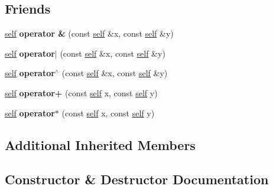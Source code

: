 \subsection*{Friends}
\begin{DoxyCompactItemize}
\item 
\mbox{\label{classez_1_1objects_1_1Boolean_a7b359bdb7de734892f01f402d9aaeb54}} 
\hyperlink{classez_1_1objects_1_1Boolean}{self} {\bfseries operator \&} (const \hyperlink{classez_1_1objects_1_1Boolean}{self} \&x, const \hyperlink{classez_1_1objects_1_1Boolean}{self} \&y)
\item 
\mbox{\label{classez_1_1objects_1_1Boolean_a1f142e40dd9c5d7d535c06ea59cc62ff}} 
\hyperlink{classez_1_1objects_1_1Boolean}{self} {\bfseries operator$\vert$} (const \hyperlink{classez_1_1objects_1_1Boolean}{self} \&x, const \hyperlink{classez_1_1objects_1_1Boolean}{self} \&y)
\item 
\mbox{\label{classez_1_1objects_1_1Boolean_af2fec163038c670c3c6c48f08fc546ab}} 
\hyperlink{classez_1_1objects_1_1Boolean}{self} {\bfseries operator$^\wedge$} (const \hyperlink{classez_1_1objects_1_1Boolean}{self} \&x, const \hyperlink{classez_1_1objects_1_1Boolean}{self} \&y)
\item 
\mbox{\label{classez_1_1objects_1_1Boolean_ac219ecb06730e7707b9bb78b5da63c3b}} 
\hyperlink{classez_1_1objects_1_1Boolean}{self} {\bfseries operator+} (const \hyperlink{classez_1_1objects_1_1Boolean}{self} x, const \hyperlink{classez_1_1objects_1_1Boolean}{self} y)
\item 
\mbox{\label{classez_1_1objects_1_1Boolean_a4f9af882c7a074ed8e1f8da41bd31dc9}} 
\hyperlink{classez_1_1objects_1_1Boolean}{self} {\bfseries operator$\ast$} (const \hyperlink{classez_1_1objects_1_1Boolean}{self} x, const \hyperlink{classez_1_1objects_1_1Boolean}{self} y)
\end{DoxyCompactItemize}
\subsection*{Additional Inherited Members}


\subsection{Constructor \& Destructor Documentation}
\mbox{\label{classez_1_1objects_1_1Boolean_a9eee9d7b6285d1d4aeb28e7b64fba3d1}} 
